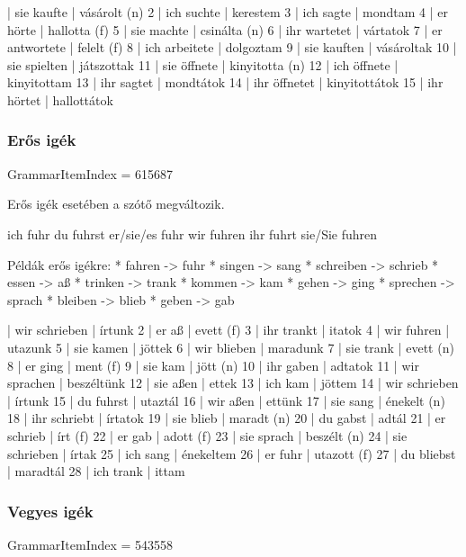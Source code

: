 \documentclass{article}
\newenvironment{desc}{\verbatim}{\endverbatim}
\newenvironment{exmp}{\verbatim}{\endverbatim}
\begin{document}
\begin{exmp}
1 | sie kaufte | vásárolt (n)
2 | ich suchte | kerestem
3 | ich sagte | mondtam
4 | er hörte | hallotta (f)
5 | sie machte | csinálta (n)
6 | ihr wartetet | vártatok
7 | er antwortete | felelt (f)
8 | ich arbeitete | dolgoztam
9 | sie kauften | vásároltak
10 | sie spielten | játszottak
11 | sie öffnete | kinyitotta (n)
12 | ich öffnete | kinyitottam
13 | ihr sagtet | mondtátok
14 | ihr öffnetet | kinyitottátok
15 | ihr hörtet | hallottátok
\end{exmp}

\subsubsection{Erős igék}

GrammarItemIndex = 615687

\begin{desc}
Erős igék esetében a szótő megváltozik.

ich fuhr
du fuhrst
er/sie/es fuhr
wir fuhren
ihr fuhrt
sie/Sie fuhren

Példák erős igékre:
* fahren -> fuhr
* singen -> sang
* schreiben -> schrieb
* essen -> aß
* trinken -> trank
* kommen -> kam
* gehen -> ging
* sprechen -> sprach
* bleiben -> blieb
* geben -> gab
\end{desc}

\begin{exmp}
1 | wir schrieben | írtunk
2 | er aß | evett (f)
3 | ihr trankt | itatok
4 | wir fuhren | utazunk
5 | sie kamen | jöttek
6 | wir blieben | maradunk
7 | sie trank | evett (n)
8 | er ging | ment (f)
9 | sie kam | jött (n)
10 | ihr gaben | adtatok
11 | wir sprachen | beszéltünk
12 | sie aßen | ettek
13 | ich kam | jöttem
14 | wir schrieben | írtunk
15 | du fuhrst | utaztál
16 | wir aßen | ettünk
17 | sie sang | énekelt (n)
18 | ihr schriebt | írtatok
19 | sie blieb | maradt (n)
20 | du gabst | adtál
21 | er schrieb | írt (f)
22 | er gab | adott (f)
23 | sie sprach | beszélt (n)
24 | sie schrieben | írtak
25 | ich sang | énekeltem
26 | er fuhr | utazott (f)
27 | du bliebst | maradtál
28 | ich trank | ittam
\end{exmp}

\subsubsection{Vegyes igék}

GrammarItemIndex = 543558
\end{document}
